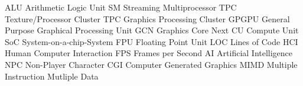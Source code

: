 \usepackage[acronyms, nonumberlist, shortcuts]{glossaries}
\makeglossaries


 {ALU} {Arithmetic Logic Unit}
 {SM} {Streaming Multiprocessor}
 {TPC} {Texture/Processor Cluster}
 {TPC} {Graphics Processing Cluster}
 {GPGPU} {General Purpose Graphical Processing Unit}
 {GCN} {Graphics Core Next}
 {CU} {Compute Unit}
 {SoC} {System-on-a-chip-System}
 {FPU} {Floating Point Unit}
 {LOC} {Lines of Code}
 {HCI} {Human Computer Interaction}
 {FPS} {Frames per Second}
 {AI} {Artificial Intelligence}
 {NPC} {Non-Player Character}
 {CGI} {Computer Generated Graphics}
 {MIMD} {Multiple Instruction Mutliple Data}
